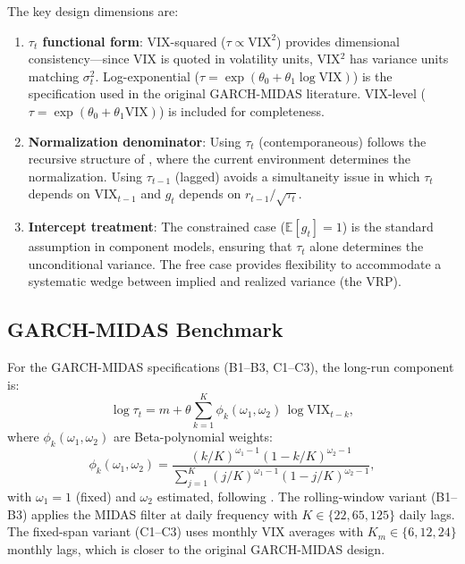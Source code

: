 \documentclass[12pt,a4paper]{article}
\newcommand{\E}{\mathbb{E}}
\begin{document}
The key design dimensions are:
\begin{enumerate}
\item \textbf{$\tau_t$ functional form}: VIX-squared ($\tau \propto \mathrm{VIX}^2$) provides dimensional consistency---since VIX is quoted in volatility units, VIX$^2$ has variance units matching $\sigma_t^2$. Log-exponential ($\tau = \exp(\theta_0 + \theta_1 \log \mathrm{VIX})$) is the specification used in the original GARCH-MIDAS literature. VIX-level ($\tau = \exp(\theta_0 + \theta_1 \mathrm{VIX})$) is included for completeness.

\item \textbf{Normalization denominator}: Using $\tau_t$ (contemporaneous) follows the recursive structure of \citet[Eq.~4]{engle2013}, where the current environment determines the normalization. Using $\tau_{t-1}$ (lagged) avoids a simultaneity issue in which $\tau_t$ depends on $\mathrm{VIX}_{t-1}$ and $g_t$ depends on $r_{t-1}/\sqrt{\tau_t}$.

\item \textbf{Intercept treatment}: The constrained case ($\E[g_t]=1$) is the standard assumption in component models, ensuring that $\tau_t$ alone determines the unconditional variance. The free case provides flexibility to accommodate a systematic wedge between implied and realized variance (the VRP).
\end{enumerate}

\subsection{GARCH-MIDAS Benchmark}
\label{sec:midas}

For the GARCH-MIDAS specifications (B1--B3, C1--C3), the long-run component is:
\begin{equation}
\log \tau_t = m + \theta \sum_{k=1}^{K} \phi_k(\omega_1, \omega_2) \, \log \mathrm{VIX}_{t-k},
\label{eq:midas_tau}
\end{equation}
where $\phi_k(\omega_1, \omega_2)$ are Beta-polynomial weights:
\begin{equation}
\phi_k(\omega_1, \omega_2) = \frac{(k/K)^{\omega_1-1}(1-k/K)^{\omega_2-1}}{\sum_{j=1}^{K}(j/K)^{\omega_1-1}(1-j/K)^{\omega_2-1}},
\label{eq:beta_weights}
\end{equation}
with $\omega_1 = 1$ (fixed) and $\omega_2$ estimated, following \citet{engle2013}. The rolling-window variant (B1--B3) applies the MIDAS filter at daily frequency with $K \in \{22, 65, 125\}$ daily lags. The fixed-span variant (C1--C3) uses monthly VIX averages with $K_m \in \{6, 12, 24\}$ monthly lags, which is closer to the original GARCH-MIDAS design.
\end{document}
